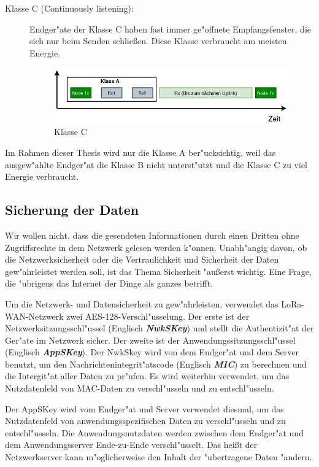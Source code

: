 \begin{description}
	\item [Klasse C (Continuously listening):] Endger"ate der Klasse C 
	haben fast immer ge"offnete Empfangsfenster, die sich nur beim 
	Senden schlie\ss{}en. Diese Klasse verbraucht am meisten Energie.
	
	\begin{figure}[h]
		\centering
		\includegraphics[width=13cm]{source/images/ClassC}
		\caption{Klasse C \label{fig:classC}}
	\end{figure}

\end{description}


Im Rahmen dieser Thesis wird nur die Klasse A ber"ucksichtig, weil das 
ausgew"ahlte Endger"at die Klasse B nicht unterst"utzt und die Klasse C 
zu viel Energie verbraucht. 

\subsection{Sicherung der Daten}\label{secure}

Wir wollen nicht, dass die gesendeten Informationen durch einen Dritten 
ohne Zugriffsrechte in dem Netzwerk gelesen werden k"onnen. 
Unabh"angig davon, ob die Netzwerksicherheit oder die Vertraulichkeit 
und Sicherheit der Daten gew"ahrleistet werden soll, ist das Thema 
Sicherheit "au\ss{}erst wichtig. Eine Frage, die "ubrigens das 
Internet der Dinge als ganzes betrifft.

Um die Netzwerk- und Datensicherheit zu gew"ahrleisten, verwendet das 
LoRa-WAN-Netzwerk zwei AES-128-Verschl"usselung. Der erste ist der 
Netzwerksitzungsschl"ussel (Englisch \textbf{\textit{\ac{NwkSKey}}}) 
und stellt die Authentizit"at der Ger"ate im Netzwerk sicher. Der zweite 
ist der Anwendungssitzungsschl"ussel (Englisch  
\textbf{\textit{\ac{AppSKey}}}). Der NwkSkey wird von dem 
Endger"at und dem Server benutzt, um den Nachrichtenintegrit"atscode 
(Englisch \textbf{\textit{\ac{MIC}}}) zu berechnen und die Intergit"at 
aller Daten zu pr"ufen.  Es wird weiterhin verwendet, um das  
Nutzdatenfeld von \ac{MAC}-Daten zu verschl"usseln und zu entschl"usseln. 

Der AppSKey wird vom Endger"at und Server verwendet diesmal, um 
das Nutzdatenfeld von anwendungsspezifischen Daten zu verschl"usseln 
und zu entschl"usseln. Die Anwendungsnutzdaten werden zwischen dem 
Endger"at und dem Anwendungsserver Ende-zu-Ende verschl"usselt. Das 
hei\ss{}t der Netzwerkserver kann m"oglicherweise den Inhalt der 
"ubertragene Daten "andern. 

